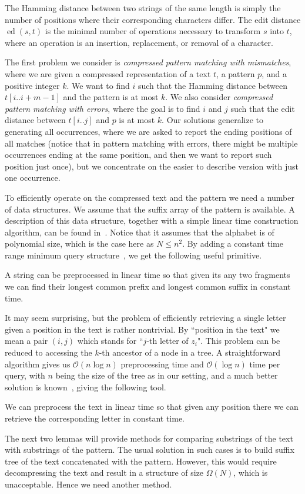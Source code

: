 \documentclass[runningheads]{llncs}
\DeclareMathOperator{\ed}{ed}
\begin{document}
The Hamming distance between two strings of the same length is simply the number of positions where their corresponding characters differ. The edit distance $\ed(s,t)$ is the minimal number of operations necessary to transform $s$ into $t$, where an operation is an insertion, replacement, or removal of a character.

The first problem we consider is {\it compressed pattern matching with mismatches}, where we are given a compressed representation of a text $t$, a pattern $p$, and a positive integer $k$. We want to find $i$ such that the Hamming distance between $t[i..i+m-1]$ and the pattern is at most $k$. 
We also consider {\it compressed pattern matching with errors}, where the goal is to find $i$ and $j$ such that the edit distance between $t[i..j]$ and $p$ is at most $k$.
Our solutions generalize to generating all occurrences, where we are asked to report the ending positions of all matches (notice that in pattern matching with errors, there might
be multiple occurrences ending at the same position, and then we want to report such position just once), but we concentrate on the easier to describe version with just one
occurrence.

To efficiently operate on the compressed text and the pattern we need a number of data structures. We assume that the suffix array of the pattern is available. A description of this data structure, together with a simple linear time construction algorithm, can be found in~\cite{Karkkainen}. Notice that it assumes that the alphabet is of polynomial size, which is the case here as $N\leq n^{2}$. By adding a constant time range minimum query structure~\cite{Bender}, we get the following useful primitive.
\begin{lemma}\label{lemma:lcapattern}
A string can be preprocessed in linear time so that given its any two fragments we can find their longest common prefix and longest common suffix in constant time.
\end{lemma}
It may seem surprising, but the problem of efficiently retrieving a single letter given a position in the text is rather nontrivial. By ``position in the text" we mean a pair $(i,j)$
which stands for ``$j$-th letter of $z_i$". This problem can be reduced to accessing the $k$-th ancestor of a node in a tree. A straightforward algorithm gives us $\mathcal{O}(n \log n)$ preprocessing time and $\mathcal{O}(\log n)$ time per query, with $n$ being the size of the tree as in our setting, and a much better solution is known~\cite{AlstrupAncestor}, giving the following tool.
\begin{lemma}\label{lemma:lettertext}
We can preprocess the text in linear time so that given any position there we can retrieve the corresponding letter in constant time.
\end{lemma}
The next two lemmas will provide methods for comparing substrings of the text with substrings of the pattern. The usual solution in such cases is to build suffix tree of the text concatenated with the pattern. However, this would require decompressing the text and result in a structure of size $\Omega(N)$, which is unacceptable. Hence we need another method.
\end{document}
